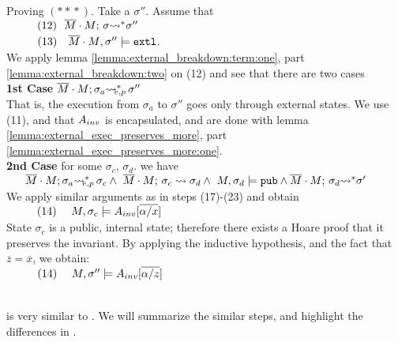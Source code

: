 \begin{description}
Proving   $(*\!*\!*)$. Take a $\sigma''$. Assume that\\
$\SPS (12) \ \ \leadstoBoundedStar   {\Mtwo\cdot M}  {\sigma}  {\sigma''}$\\
$\strut \ \ \hspace{0.5cm} \ \  (13) \ \ \ {\overline{M}\cdot M}, \sigma'' \models \mbox{\normalfont{\texttt{extl}}}$.\\
We apply lemma \ref{lemma:external_breakdown:term:one}, part \ref{lemma:external_breakdown:two}
on (12) and see that there are two cases\\
\textbf{1st Case} $\overline{M}\cdot M; \sigma_a {\rightsquigarrow^*}\!\!\!\!_{e,p}\, \sigma''$\\
That is, the execution from $\sigma_a$ to $\sigma''$ goes only through external states. 
We use (11), and that 
 $A_{inv}$ is encapsulated, and are done with lemma \ref{lemma:external_exec_preserves_more}, part 
 \ref{lemma:external_exec_preserves_more:one}.
\\
\textbf{2nd Case} for some  $\sigma_c$, $\sigma_d.$ we have\\
$
\strut \ \ \ \ \ \overline{M}\cdot M; \sigma_a {\rightsquigarrow^*}\!\!\!\!_{e,p}\, \sigma_c 
\wedge\ \overline{M}\cdot M;\, {\sigma_c} \rightsquigarrow \sigma_d 
\wedge \ M, \sigma_d \models \mbox{\normalfont{\texttt{pub}}} \wedge \overline{M}\cdot M;\, {\sigma_d} {\rightsquigarrow^*} \sigma'$\\
We apply similar arguments as in steps (17)-(23) and obtain \\
$\strut \ \ \hspace{0.5cm} \ \  (14) \ \ \ \ {M, \sigma_c \models A_{inv}[\overline{\alpha/x} ]} $ 
\\
State $\sigma_c$ is a public, internal state;  therefore there exists a Hoare proof that it preserves the invariant.
By applying the inductive hypothesis, and the fact that $\overline z = \overline x$, we obtain:
\\
$\strut \ \ \hspace{0.5cm} \ \  (14) \ \ \ \ {M, \sigma'' \models A_{inv}[\overline{\alpha/z} ]} $
\\
~ \\

\item[{\sc{Call\_Ext\_Adapt\_Strong}}] is  very similar to {}.
We will summarize the similar steps, and highlight the differences in .


\end{description}

